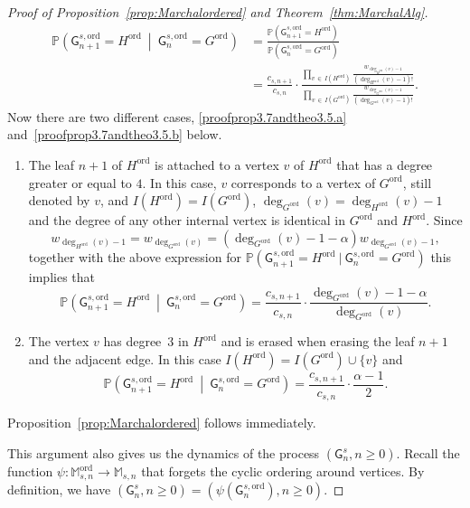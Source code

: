 \documentclass[10pt]{amsart}
\theoremstyle{definition}\newtheorem{defi}[theo]{Definition}\newtheorem{rema}[theo]{Remark}\newtheorem{exam}[theo]{Example}\newtheorem{exem}[theo]{Example}\newtheorem{nota}[theo]{Notation}
\newcommand{\Pp}[1]{\mathbb{P} \left(#1\right)}
\newcommand{\ord}{\mathrm{ord}}
\newcommand{\sG}{\mathsf{G}}
\newcommand{\M}{\mathbb{M}}
\newcommand*{\alphenumi}{\renewcommand*{\theenumi}{\alph{enumi}}}
\begin{document}
\begin{proof}[Proof of Proposition~\ref{prop:Marchalordered} and Theorem~\ref{thm:MarchalAlg}]
\begin{align*}
\Pp{\sG^{s,\ord}_{n+1}=H^{\ord} \ \middle|\ \sG^{s,\ord}_{n}=G^{\ord}} &= \frac{\Pp{\sG^{s,\ord}_{n+1}=H^{\ord}}}{\Pp{\sG^{s,\ord}_{n}=G^{\ord}}} \\
&= \frac{c_{s,n+1}}{c_{s,n}} \cdot \frac{\displaystyle \prod_{v\,\in\,I\left(H^{\ord}\right)}\frac{w_{\deg_{H^{\ord}}(v)-1}}{\left(\deg_{H^{\ord}}(v)-1\right)!}}{\displaystyle \prod_{v\,\in\,I\left(G^{\ord}\right)}\frac{w_{\deg_{G^{\ord}}(v)-1}}{\left(\deg_{G^{\ord}}(v)-1\right)!}}.
\end{align*}
Now there are two different cases, \eqref{proofprop3.7andtheo3.5.a} and~\eqref{proofprop3.7andtheo3.5.b} below.
\begin{enumerate}\alphenumi
\item\label{proofprop3.7andtheo3.5.a} The leaf $n+1$ of $H^{\ord}$ is attached to a vertex $v$ of $H^{\ord}$ that has a degree greater or equal to $4$. In this case, $v$ corresponds to a vertex of $G^{\ord}$, still denoted by $v$, and $I(H^{\ord})=I(G^{\ord})$, $\deg_{G^{\ord}}(v)=\deg_{H^{\ord}}(v)-1$ and the degree of any other internal vertex is identical in $G^{\ord}$ and $H^{\ord}$. Since
\[
w_{\deg_{H^{\ord}}(v)-1}=w_{\deg_{G^{\ord}}(v)}=\left(\deg_{G^{\ord}}(v) -1-\alpha\right)w_{\deg_{G^{\ord}}(v)-1},
\]
together with the above expression for $\Pp{\sG^{s,\ord}_{n+1}=H^{\ord} \ | \ \sG^{s,\ord}_{n}=G^{\ord}}$ this implies that
\begin{equation}\label{eq:marchal algo on vertex}
\Pp{\sG^{s,\ord}_{n+1}=H^{\ord} \ \middle|\ \sG^{s,\ord}_{n}=G^{\ord}}=\frac{c_{s,n+1}}{c_{s,n}} \cdot \frac{\deg_{G^{\ord}}(v) -1-\alpha}{\deg_{G^{\ord}}(v)}.
\end{equation}
\item\label{proofprop3.7andtheo3.5.b} The vertex $v$ has degree~$3$ in $H^{\ord}$ and is erased when erasing the leaf $n+1$ and the adjacent edge. In this case $I(H^{\ord})=I(G^{\ord})\cup \{v\}$ and
\begin{equation}\label{eq:marchal algo on edge}
\Pp{\sG^{s,\ord}_{n+1}=H^{\ord}\ \middle| \ \sG^{s,\ord}_{n}=G^{\ord}}=\frac{c_{s,n+1}}{c_{s,n}} \cdot \frac{\alpha-1}{2}.
\end{equation}
\end{enumerate}
Proposition~\ref{prop:Marchalordered} follows immediately.

This argument also gives us the dynamics of the process $(\sG^s_n,n \geq 0)$. Recall the function $\psi:\M^{\ord}_{s,n}\rightarrow \M_{s,n}$ that forgets the cyclic ordering around vertices. By definition, we have $(\sG^s_n,n \geq 0)=( \psi(\sG^{s,\ord}_{n}), n\geq 0)$.


\end{proof}
\end{document}
